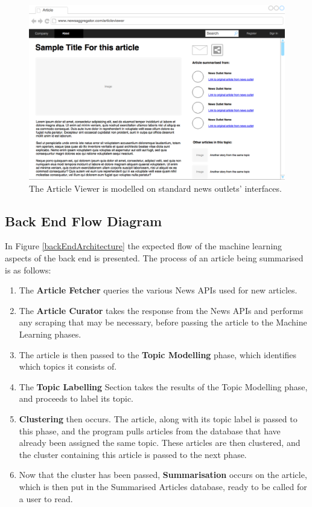 \documentclass[12pt]{article}
\begin{document}
\begin{figure}[ht!]
  \centering
    \includegraphics[scale=0.3]{ArticleViewer.png}
   \caption[A wireframe of the Article Viewer]{The Article Viewer is modelled on standard news outlets' interfaces.}
   \label{articleViewer}
\end{figure}

\subsection{Back End Flow Diagram}

In Figure \ref{backEndArchitecture} the expected flow of the machine learning aspects of the back end is presented. The process of an article being summarised is as follows:

\begin{enumerate}
	\item The \textbf{Article Fetcher} queries the various News APIs used for new articles. 
	\item The \textbf{Article Curator} takes the response from the News APIs and performs any scraping that may be necessary, before passing the article to the Machine Learning phases. 
	\item The article is then passed to the \textbf{Topic Modelling} phase, which identifies which topics it consists of. 
	\item The \textbf{Topic Labelling} Section takes the results of the Topic Modelling phase, and proceeds to label its topic. 
	\item \textbf{Clustering} then occurs. The article, along with its topic label is passed to this phase, and the program pulls articles from the database that have already been assigned the same topic. These articles are then clustered, and the cluster containing this article is passed to the next phase. 
	\item Now that the cluster has been passed, \textbf{Summarisation} occurs on the article, which is then put in the Summarised Articles database, ready to be called for a user to read. 
\end{enumerate}
\end{document}
